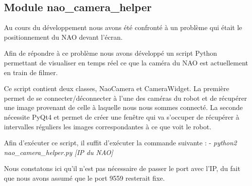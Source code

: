 \subsection{Module nao\_camera\_helper}
\label{sub:Module nao_camera_helper}
	\par Au cours du développement nous avons été confronté à un problème qui était le positionnement du NAO devant l'écran.
	\par Afin de répondre à ce problème nous avons développé un script Python permettant de visualiser en temps réel ce que la caméra du NAO est actuellement en train de filmer.
	\par Ce script contient deux classes, NaoCamera et CameraWidget.
	La première permet de se connecter/déconnecter à l'une des caméras du robot et de récupérer une image provenant de celle à laquelle nous nous sommes connecté.
	La seconde nécessite PyQt4 et permet de créer une fenêtre qui va s'occuper de récupérer à intervalles réguliers les images correspondantes à ce que voit le robot.
	\par Afin d'exécuter ce script, il suffit d'exécuter la commande suivante :
	- \textit{python2 nao\_camera\_helper.py [IP du NAO]}
	\par Nous constatons ici qu'il n'est pas nécessaire de passer le port avec l'IP, du fait que nous avons assumé que le port 9559 resterait fixe.
\pagebreak
